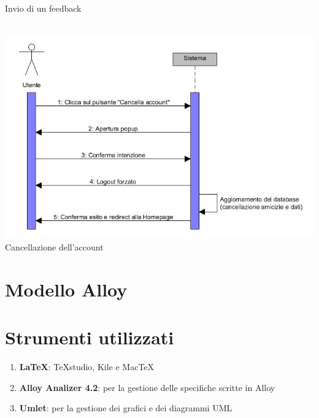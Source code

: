 \documentclass[a4paper,12pt]{article}
\begin{document}
\begin{center}
\caption{Invio di un feedback} \\
\vspace*{\fill}
\includegraphics[scale=0.6]{sDiagrams/cancellazioneAccount.jpg} \\
\caption{Cancellazione dell'account}
\end{center}
\clearpage
\section{Modello Alloy}
\section{Strumenti utilizzati}
\begin{enumerate}
\itemsep0em
\item \textbf{\LaTeX}: TeXstudio, Kile e MacTeX
\item \textbf{Alloy Analizer 4.2}: per la gestione delle specifiche scritte in Alloy
\item \textbf{Umlet}: per la gestione dei grafici e dei diagrammi UML
\end{enumerate}
\end{document}
